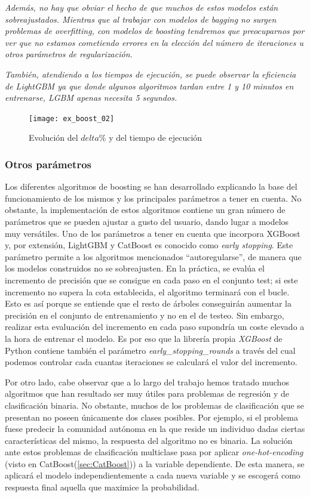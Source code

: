 \documentclass[12pt,twoside]{article}
\begin{document}
\emph{Además, no hay que obviar el hecho de que muchos de estos modelos están sobreajustados. Mientras que al trabajar con modelos de bagging no surgen problemas de overfitting, con modelos de boosting tendremos que preocuparnos por ver que no estamos cometiendo errores en la elección del número de iteraciones u otros parámetros de regularización.}

\emph{También, atendiendo a los tiempos de ejecución, se puede observar la eficiencia de LightGBM ya que donde algunos algoritmos tardan entre 1 y 10 minutos en entrenarse, LGBM apenas necesita 5 segundos.}

\begin{figure}[h]
\centering
\texttt{[image: ex\_boost\_02]}
\caption{Evolución del $delta\%$ y del tiempo de ejecución}
\end{figure}





\subsubsection{Otros parámetros}

Los diferentes algoritmos de boosting se han desarrollado explicando la base del funcionamiento de los mismos y los principales parámetros a tener en cuenta. No obstante, la implementación de estos algoritmos contiene un gran número de parámetros que se pueden ajustar a gusto del usuario, dando lugar a modelos muy versátiles. Uno de los parámetros a tener en cuenta que incorpora XGBoost y, por extensión, LightGBM y CatBoost es conocido como \textit{early stopping}. Este parámetro permite a los algoritmos mencionados ``autoregularse'', de manera que los modelos construidos no se sobreajusten. En la práctica, se evalúa el incremento de precisión que se consigue en cada paso en el conjunto test; si este incremento no supera la cota establecida, el algoritmo terminará con el bucle. Esto es así porque se entiende que el resto de árboles conseguirán aumentar la precisión en el conjunto de entrenamiento y no en el de testeo. Sin embargo, realizar esta evaluación del incremento en cada paso supondría un coste elevado a la hora de entrenar el modelo. Es por eso que la librería propia \textit{XGBoost} de Python contiene también el parámetro \textit{early\_stopping\_rounds} a través del cual podemos controlar cada cuantas iteraciones se calculará el valor del incremento.

Por otro lado, cabe observar que a lo largo del trabajo hemos tratado muchos algoritmos que han resultado ser muy útiles para problemas de regresión y de clasificación binaria. No obstante, muchos de los problemas de clasificación que se presentan no poseen únicamente dos clases posibles. Por ejemplo, si el problema fuese predecir la comunidad autónoma en la que reside un individuo dadas ciertas características del mismo, la respuesta del algoritmo no es binaria. La solución ante estos problemas de clasificación multiclase pasa por aplicar \textit{one-hot-encoding} (visto en CatBoost(\ref{sec:CatBoost})) a la variable dependiente. De esta manera, se aplicará el modelo independientemente a cada nueva variable y se escogerá como respuesta final aquella que maximice la probabilidad.
\end{document}
